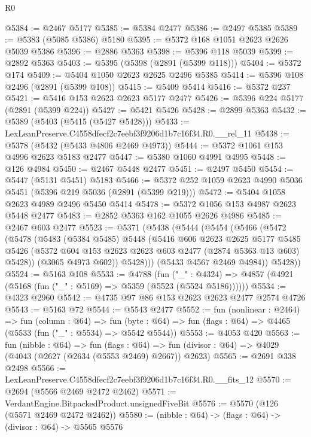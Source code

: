 \begin{lexlean}{R0}
\begin{coremodule}
@5384 := @2467 @5177
@5385 := @5384 @2477
@5386 := @2497 @5385
@5389 := @5383 (@5085 @5386) @5180
@5395 := @5372 @168 @1051 @2623 @2626 @5039 @5386
@5396 := @2886 @5363
@5398 := @5396 @118 @5039
@5399 := @2892 @5363
@5403 := @5395 (@5398 (@2891 (@5399 @118)))
@5404 := @5372 @174
@5409 := @5404 @1050 @2623 @2625 @2496 @5385
@5414 := @5396 @108 @2496 (@2891 (@5399 @108))
@5415 := @5409 @5414
@5416 := @5372 @237
@5421 := @5416 @153 @2623 @2623 @5177 @2477
@5426 := @5396 @224 @5177 (@2891 (@5399 @224))
@5427 := @5421 @5426
@5428 := @2899 @5363
@5432 := @5389 (@5403 (@5415 (@5427 @5428)))
@5433 := LexLeanPreserve.C4558dfecf2c7eebf3f9206d1b7c16f34.R0.__rel_11
@5438 := @5378 (@5432 (@5433 @4806 @2469 @4973))
@5444 := @5372 @1061 @153 @4996 @2623 @5183 @2477
@5447 := @5380 @1060 @4991 @4995
@5448 := @126 @4984
@5450 := @2467 @5448 @2477
@5451 := @2497 @5450
@5454 := @5447 (@5131 @5451) @5183
@5466 := @5372 @252 @1059 @2623 @4990 @5036 @5451 (@5396 @219 @5036 (@2891 (@5399 @219)))
@5472 := @5404 @1058 @2623 @4989 @2496 @5450 @5414
@5478 := @5372 @1056 @153 @4987 @2623 @5448 @2477
@5483 := @2852 @5363 @162 @1055 @2626 @4986
@5485 := @2467 @603 @2477
@5523 := @5371
    (@5438
      (@5444
        (@5454
          (@5466
            (@5472
              (@5478
                (@5483
                  (@5384 @5485)
                  @5448
                  (@5416
                    @606
                    @2623
                    @2625
                    @5177
                    @5485
                    @5426
                    (@5372 @604 @153 @2623 @2623 @603 @2477 (@2874 @5363 @13 @603) @5428))
                  (@3065 @4973 @602))
                @5428)))
          (@5433 @4567 @2469 @4984))
        @5428))
@5524 := @5163 @108
@5533 := @4788
    (fun ("_" : @4324) => @4857 (@4921 (@5168 (fun ("_" : @5169) => @5359 (@5523 (@5524 @5186))))))
@5534 := @4323 @2960
@5542 := @4735 @97 @86 @153 @2623 @2623 @2477 @2574 @4726
@5543 := @5163 @72
@5544 := @5543 @2477
@5552 := fun (nonlinear : @2464) =>
  fun (column : @64) =>
  fun (byte : @64) => fun (flags : @64) => @4465 (@5533 (fun ("_" : @5534) => @5542 @5544))
@5553 := @4053 @420
@5563 := fun (nibble : @64) =>
  fun (flags : @64) =>
  fun (divisor : @64) => @4029 (@4043 (@2627 (@2634 (@5553 @2469) @2667)) @2623)
@5565 := @2691 @338 @2498
@5566 := LexLeanPreserve.C4558dfecf2c7eebf3f9206d1b7c16f34.R0.__fits_12
@5570 := @2694 (@5566 @2469 @2472 @2462)
@5571 := VerdantEngine.BitpackedProduct.unsignedFiveBit
@5576 := @5570 (@126 (@5571 @2469 @2472 @2462))
@5580 := (nibble : @64) -> (flags : @64) -> (divisor : @64) -> @5565 @5576

\end{coremodule}
\end{lexlean}
